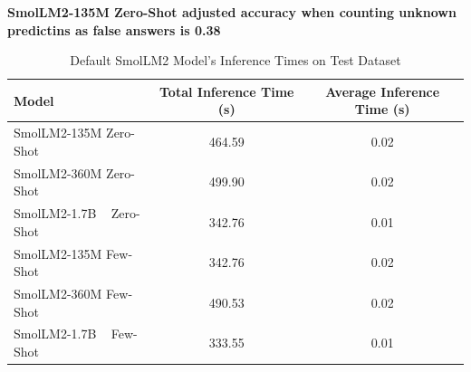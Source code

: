 \documentclass[10pt,twocolumn,letterpaper]{article}
\begin{document}
\begin{table}
\begin{center}
\end{center}
\caption{Default SmolLM2 Model's Results on Test Dataset}
\label{tab:contributions}
\end{table}

\textbf{SmolLM2-135M Zero-Shot adjusted accuracy when counting unknown predictins as false answers is 0.38}





\begin{table}
\begin{center}
\begin{tabular}{|l|c|c|}
\hline
Model & Total Inference Time (s) & Average Inference Time (s)  \\
\hline\hline
SmolLM2-135M Zero-Shot   & 464.59 & 0.02    \\

SmolLM2-360M Zero-Shot   & 499.90 & 0.02    \\

SmolLM2-1.7B ~ Zero-Shot & 342.76 & 0.01    \\

SmolLM2-135M Few-Shot    & 342.76 & 0.02    \\

SmolLM2-360M Few-Shot    & 490.53 & 0.02    \\

SmolLM2-1.7B ~ Few-Shot  & 333.55 & 0.01    \\
\hline
\end{tabular}
\end{center}
\caption{Default SmolLM2 Model's Inference Times on Test Dataset}
\label{tab:contributions}
\end{table}
\end{document}

